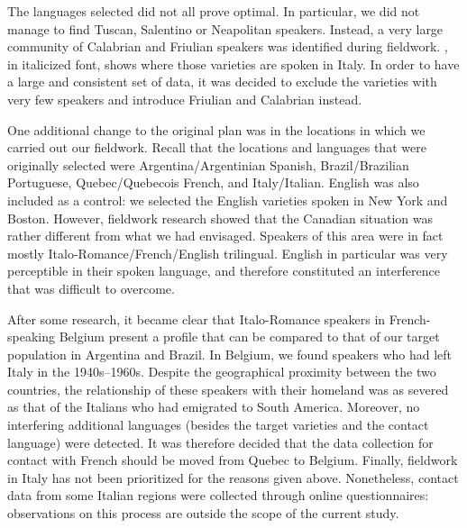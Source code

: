 \documentclass[output=paper,hidelinks]{langscibook}
\begin{document}
\largerpage
The languages selected did not all prove optimal. In particular, we did not manage to find Tuscan, Salentino or Neapolitan speakers. Instead, a very large community of Calabrian and Friulian speakers was identified during fieldwork. , in italicized font, shows where those varieties are spoken in Italy. In order to have a large and consistent set of data, it was decided to exclude the varieties with very few speakers and introduce Friulian and Calabrian instead. 

One additional change to the original plan was in the locations in which we carried out our fieldwork. Recall that the locations and languages that were originally selected were Argentina/Argentinian Spanish, Brazil/Brazilian Portuguese, Quebec/Quebecois French, and Italy/Italian. English was also included as a control: we selected the English varieties spoken in New York and Boston. However, fieldwork research showed that the Canadian situation was rather different from what we had envisaged. Speakers of this area were in fact mostly Italo-Romance/French/English trilingual. English in particular was very perceptible in their spoken language, and therefore constituted an interference that was difficult to overcome. 

After some research, it became clear that Italo-Romance speakers in French-speaking Belgium present a profile that can be compared to that of our target population in Argentina and Brazil. In Belgium, we found speakers who had left Italy in the 1940s--1960s. Despite the geographical proximity between the two countries, the relationship of these speakers with their homeland was as severed as that of the Italians who had emigrated to South America. Moreover, no interfering additional languages (besides the target varieties and the contact language) were detected. It was therefore decided that the data collection for contact with French should be moved from Quebec to Belgium. Finally, fieldwork in Italy has not been prioritized for the reasons given above. Nonetheless, contact data from some Italian regions were collected through online questionnaires: observations on this process are outside the scope of the current study.
\end{document}
